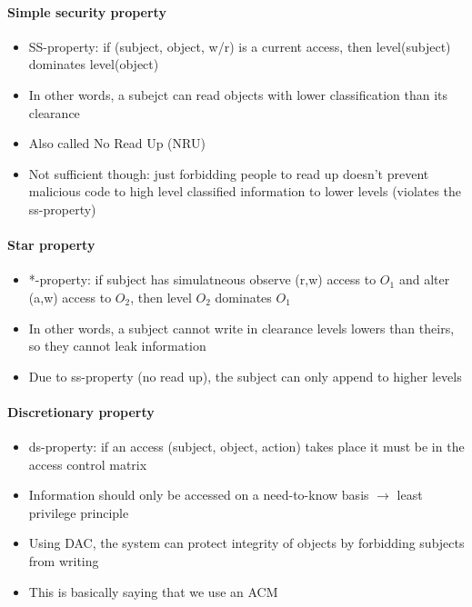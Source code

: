 \documentclass{article}
\newenvironment{myitemize}
{ \begin{itemize}
    \setlength{\itemsep}{005pt}
    \setlength{\parskip}{0pt}
    \setlength{\parsep}{0pt}     }
{ \end{itemize}                  }
\begin{document}
\begin{multicols}{2}
\paragraph{Simple security property}

\begin{myitemize}
    \item SS-property: if (subject, object, w/r) is a current access, then level(subject) dominates level(object)
    \item In other words, a subejct can read objects with lower classification than its clearance
    \item Also called No Read Up (NRU)
    \item Not sufficient though: just forbidding people to read up doesn't prevent malicious code to high level classified information to lower levels (violates the ss-property)
\end{myitemize}

\paragraph{Star property}

\begin{myitemize}
    \item *-property: if subject has simulatneous observe (r,w) access to $O_1$ and alter (a,w) access to $O_2$, then level $O_2$ dominates $O_1$
    \item In other words, a subject cannot  write in clearance levels lowers than theirs, so they cannot leak information
    \item Due to ss-property (no read up), the subject can only append to higher levels
\end{myitemize}

\paragraph{Discretionary property}

\begin{myitemize}
    \item ds-property: if an access (subject, object, action) takes place it must be in the access control matrix
    \item Information should only be accessed on a need-to-know basis $\rightarrow$ least privilege principle
    \item Using DAC, the system can protect integrity of objects by forbidding subjects from writing
    \item This is basically saying that we use an ACM
\end{myitemize}


\end{multicols}
\end{document}
